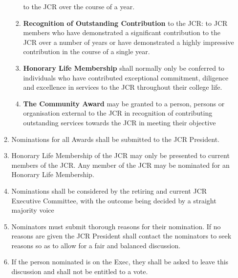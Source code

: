 \begin{enumerate}
\begin{enumerate}
\begin{enumerate}
            to the JCR over the course of a year.
            \item \textbf{Recognition of Outstanding Contribution} to the JCR: to JCR members who have
            demonstrated a significant contribution to the JCR over a number of years or have
            demonstrated a highly impressive contribution in the course of a single year.
            \item \textbf{Honorary Life Membership} shall normally only be conferred to individuals who have
            contributed exceptional commitment, diligence and excellence in services to the JCR
            throughout their college life.
            \item \textbf{The Community Award} may be granted to a person, persons or organisation external
            to the JCR in recognition of contributing outstanding services towards the JCR in
            meeting their objective
        \end{enumerate}
        \item Nominations for all Awards shall be submitted to the JCR President.
        \item Honorary Life Membership of the JCR may only be presented to current members of the JCR. Any
        member of the JCR may be nominated for an Honorary Life Membership.
        \item Nominations shall be considered by the retiring and current JCR Executive Committee, with the
        outcome being decided by a straight majority voice
        \item Nominators must submit thorough reasons for their nomination. If no reasons are given the JCR
        President shall contact the nominators to seek reasons so as to allow for a fair and balanced
        discussion.
        \item If the person nominated is on the Exec, they shall be asked to leave this discussion and shall not
        be entitled to a vote.
    \end{enumerate}
\end{enumerate}
